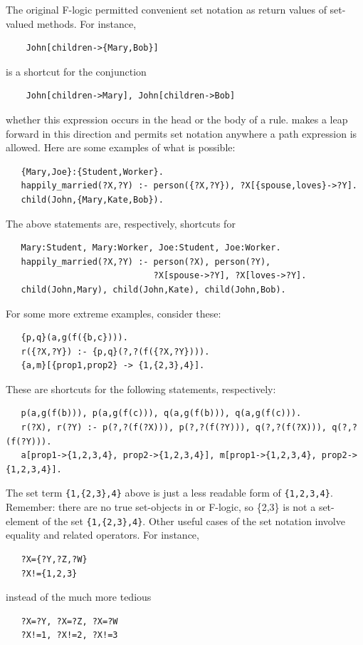 \documentclass[11pt]{article}
\newcommand{\ERGO}{\mbox{\smaller{\ensuremath{\cal{E}}\smaller{{\sc{RGO}}}}}\xspace}
\newcommand{\FLSYSTEM}{\ERGO}
\begin{document}
The original F-logic \cite{KLW95} permitted convenient set notation as
return values of set-valued methods. For instance,
\begin{verbatim}
    John[children->{Mary,Bob}]
\end{verbatim}
is a shortcut for the conjunction
\begin{verbatim}
    John[children->Mary], John[children->Bob]
\end{verbatim}
whether this expression occurs in the head or the body of a rule. \FLSYSTEM
makes a leap forward in this direction and permits set notation anywhere a
path expression is allowed. Here are some examples of what is possible:
\begin{verbatim}
   {Mary,Joe}:{Student,Worker}.
   happily_married(?X,?Y) :- person({?X,?Y}), ?X[{spouse,loves}->?Y].
   child(John,{Mary,Kate,Bob}).
\end{verbatim}
The above statements are, respectively, shortcuts for 
\begin{verbatim}
   Mary:Student, Mary:Worker, Joe:Student, Joe:Worker.
   happily_married(?X,?Y) :- person(?X), person(?Y),
                             ?X[spouse->?Y], ?X[loves->?Y].
   child(John,Mary), child(John,Kate), child(John,Bob).
\end{verbatim}
For some more extreme examples, consider these:
\begin{verbatim}
   {p,q}(a,g(f({b,c}))).
   r({?X,?Y}) :- {p,q}(?,?(f({?X,?Y}))).
   {a,m}[{prop1,prop2} -> {1,{2,3},4}].
\end{verbatim}
These are shortcuts for the following statements, respectively:
\begin{verbatim}
   p(a,g(f(b))), p(a,g(f(c))), q(a,g(f(b))), q(a,g(f(c))).
   r(?X), r(?Y) :- p(?,?(f(?X))), p(?,?(f(?Y))), q(?,?(f(?X))), q(?,?(f(?Y))).
   a[prop1->{1,2,3,4}, prop2->{1,2,3,4}], m[prop1->{1,2,3,4}, prop2->{1,2,3,4}].
\end{verbatim}
The set term \texttt{\{1,\{2,3\},4\}} above is just a less readable form of
\texttt{\{1,2,3,4\}}. Remember: there are no true set-objects in
\FLSYSTEM or F-logic, so \{2,3\} is not a set-element of the set
\texttt{\{1,\{2,3\},4\}}.
Other useful cases of the set notation involve equality and related
operators. For instance,
\begin{verbatim}
   ?X={?Y,?Z,?W}
   ?X!={1,2,3}
\end{verbatim}
instead of the much more tedious
\begin{verbatim}
   ?X=?Y, ?X=?Z, ?X=?W
   ?X!=1, ?X!=2, ?X!=3
\end{verbatim}
\end{document}
